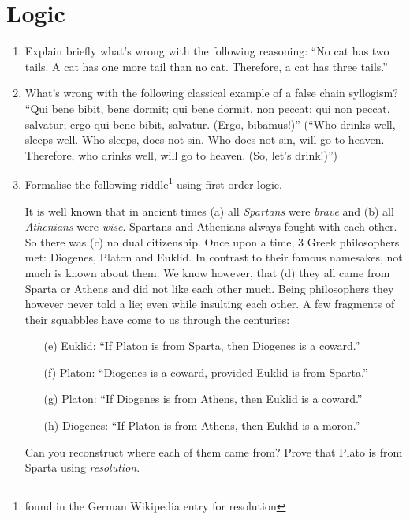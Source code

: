 \documentclass[a4paper,11pt,oneside]{scrartcl}
\begin{document}
\section{Logic}

\begin{enumerate}
\item Explain briefly what's wrong with the following reasoning:
``No cat has two tails. A cat has one more tail than no cat. Therefore, a cat has three tails.''

\item What's wrong with the following classical example of a false chain syllogism? 
``Qui bene bibit, bene dormit; qui bene dormit, non peccat; qui non peccat, salvatur; ergo qui bene bibit, salvatur. (Ergo, bibamus!)'' (``Who drinks well, sleeps well. Who sleeps, does not sin. Who does not sin, will go to heaven. Therefore, who drinks well, will go to heaven. (So, let's drink!)'')


\item Formalise the following riddle\footnote{found in the German Wikipedia entry for resolution} using first order logic.

It is well known that in ancient times (a) all \emph{Spartans} were \emph{brave} and (b) all \emph{Athenians} were \emph{wise}.
Spartans and Athenians always fought with each other. So there was (c) no dual citizenship.
Once upon a time, 3 Greek philosophers met: Diogenes, Platon and Euklid. In contrast to their
famous namesakes, not much is known about them. We know however, that
(d) they all came from Sparta or Athens and did not like each other much.
Being philosophers they however never told a lie; even while insulting each other.
A few fragments of their squabbles have come to us through the centuries:

\begin{enumerate}
\item[(e)] Euklid: ``If Platon is from Sparta, then Diogenes is a coward.''
\item[(f)] Platon: ``Diogenes is a coward, provided Euklid is from Sparta.''
\item[(g)] Platon: ``If Diogenes is from Athens, then Euklid is a coward.''
\item[(h)] Diogenes: ``If Platon is from Athens, then Euklid is a moron.''
\end{enumerate}

Can you reconstruct where each of them came from?
Prove that Plato is from Sparta using \emph{resolution}.


\end{enumerate}
\end{document}
